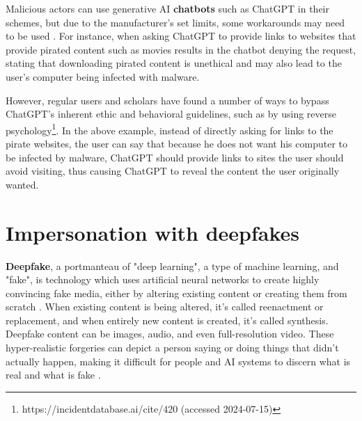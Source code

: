 Malicious actors can use generative AI  \textbf{chatbots} such as ChatGPT in their schemes, but due to the manufacturer's set limits, some workarounds may need to be used \citep{guptaFromChatGPTtoThreatGPT2023}. For instance, when asking ChatGPT to provide links to websites that provide pirated content such as movies results in the chatbot denying the request, stating that downloading pirated content is unethical and may also lead to the user's computer being infected with malware.


However, regular users and scholars have found a number of ways to bypass ChatGPT's inherent ethic and behavioral guidelines, such as by using reverse psychology\footnote{https://incidentdatabase.ai/cite/420 (accessed 2024-07-15)}. In the above example, instead of directly asking for links to the pirate websites, the user can say that because he does not want his computer to be infected by malware, ChatGPT should provide links to sites the user should avoid visiting, thus causing ChatGPT to reveal the content the user originally wanted.













\section{Impersonation with deepfakes}
\begin{comment}
Deepfake-generated content

What to cover:
    - What is a deepfake
    - Deepfakeja ei käsitely aiemmin? Generative AI kappaleessa?
    - Seuraava section kertoo tietojenkalastelusta ja sitoo chatbotit, automated intelligence gathering ja nää deepfaket yhteen kokonaisuudeksi

\end{comment}

\textbf{Deepfake}, a portmanteau of "deep learning", a type of machine learning, and "fake", is technology which uses artificial neural networks to create highly convincing fake media, either by altering existing content or creating them from scratch \citep{mirskyTheCreationAndDetectionOfDeepfakes2021}. When existing content is being altered, it's called reenactment or replacement, and when entirely new content is created, it's called synthesis. Deepfake content can be images, audio, and even full-resolution video. These hyper-realistic forgeries can depict a person saying or doing things that didn't actually happen, making it difficult for people and AI systems to discern what is real and what is fake \citep{blauthArtificialIntelligenceCrimeOverviewMaliciousUseAbuse2022}.

